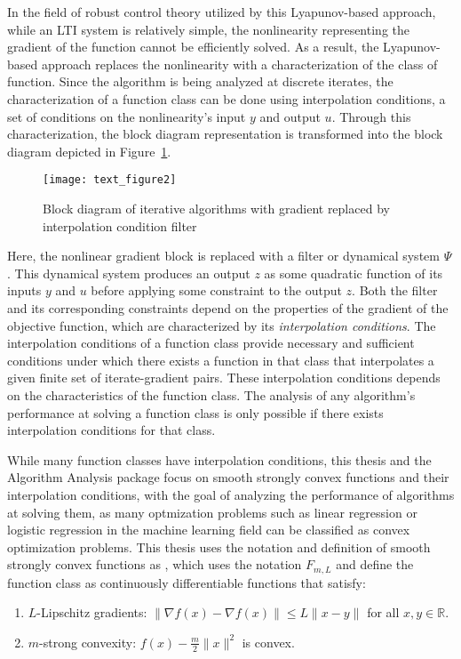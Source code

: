 In the field of robust control theory utilized by this Lyapunov-based approach, while an LTI system is relatively simple, the nonlinearity representing the gradient of the function cannot be efficiently solved. As a result, the Lyapunov-based approach replaces the nonlinearity with a characterization of the class of function. Since the algorithm is being analyzed at discrete iterates, the characterization of a function class can be done using interpolation conditions, a set of conditions on the nonlinearity's input $y$ and output $u$. Through this characterization, the block diagram representation is transformed into the block diagram depicted in Figure~\ref{plot_block_diagram2}.
\begin{figure}[h]
    \centering
	\texttt{[image: text\_figure2]}
    \caption{Block diagram of iterative algorithms with gradient replaced by interpolation condition filter}
    \label{plot_block_diagram2}
\end{figure}
Here, the nonlinear gradient block is replaced with a filter or dynamical system $\Psi$. This dynamical system produces an output $z$ as some quadratic function of its inputs $y$ and $u$ before applying some constraint to the output $z$. Both the filter and its corresponding constraints depend on the properties of the gradient of the objective function, which are characterized by its \textit{interpolation conditions}. The interpolation conditions of a function class provide necessary and sufficient conditions under which there exists a function in that class that interpolates a given finite set of iterate-gradient pairs. These interpolation conditions depends on the characteristics of the function class. The analysis of any algorithm's performance at solving a function class is only possible if there exists interpolation conditions for that class.

While many function classes have interpolation conditions, this thesis and the Algorithm Analysis package focus on smooth strongly convex functions and their interpolation conditions, with the goal of analyzing the performance of algorithms at solving them, as many optmization problems such as linear regression or logistic regression in the machine learning field can be classified as convex optimization problems. This thesis uses the notation and definition of smooth strongly convex functions as \cite{tutorial}, which uses the notation $F_{m,L}$ and define the function class as continuously differentiable functions that satisfy:
\begin{enumerate}
	\item $L$-Lipschitz gradients: $\|\nabla f(x) - \nabla f(x)\| \leq L\|x-y\|$ for all $x, y \in \mathbb{R}$.
	\item $m$-strong convexity: $f(x) - \frac{m}{2}\|x\|^2$ is convex.
\end{enumerate}


